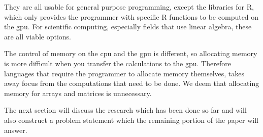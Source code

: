 They are all usable for general purpose programming, except the libraries for R, which only provides the programmer with specific R functions to be computed on the \acrshort{gpu}. 
For scientific computing, especially fields that use linear algebra, these are all viable options.

The control of memory on the \acrshort{cpu} and the \acrshort{gpu} is different, so allocating memory is more difficult when you transfer the calculations to the \acrshort{gpu}. 
Therefore languages that require the programmer to allocate memory themselves, takes away focus from the computations that need to be done.
We deem that allocating memory for arrays and matrices is unnecessary. 

The next section will discuss the research which has been done so far and will also construct a problem statement which the remaining portion of the paper will answer.